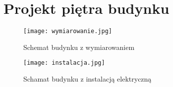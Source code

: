 \documentclass[a4paper]{article}
\begin{document}
\newpage 

\section{Projekt piętra budynku}

\begin{figure}[h]
   \texttt{[image: wymiarowanie.jpg]}
   \caption{Schemat budynku z wymiarowaniem}
\end{figure}

\newpage

\begin{figure}[h]
   \texttt{[image: instalacja.jpg]}
   \caption{Schamat budynku z instalacją elektryczną}
\end{figure}
\end{document}
